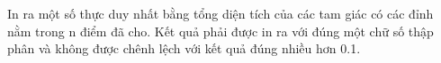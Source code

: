 In ra một số thực duy nhất bằng tổng diện tích của các tam giác có các đỉnh nằm trong n điểm đã cho. Kết quả phải được in ra với đúng một chữ số thập phân và không được chênh lệch với kết quả đúng nhiều hơn 0.1.